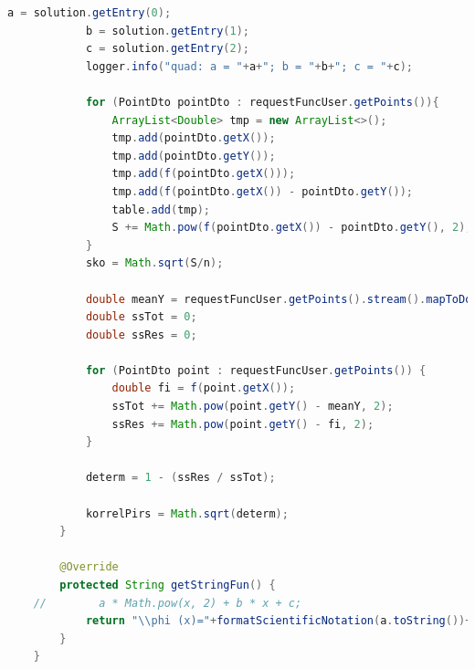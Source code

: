 \documentclass{article}
\begin{document}
\begin{lstlisting}[language=Java, caption={Квадратичная аппроксимация}]
            a = solution.getEntry(0);
            b = solution.getEntry(1);
            c = solution.getEntry(2);
            logger.info("quad: a = "+a+"; b = "+b+"; c = "+c);
    
            for (PointDto pointDto : requestFuncUser.getPoints()){
                ArrayList<Double> tmp = new ArrayList<>();
                tmp.add(pointDto.getX());
                tmp.add(pointDto.getY());
                tmp.add(f(pointDto.getX()));
                tmp.add(f(pointDto.getX()) - pointDto.getY());
                table.add(tmp);
                S += Math.pow(f(pointDto.getX()) - pointDto.getY(), 2);
            }
            sko = Math.sqrt(S/n);
    
            double meanY = requestFuncUser.getPoints().stream().mapToDouble(PointDto::getY).average().orElse(0);
            double ssTot = 0;
            double ssRes = 0;
    
            for (PointDto point : requestFuncUser.getPoints()) {
                double fi = f(point.getX());
                ssTot += Math.pow(point.getY() - meanY, 2);
                ssRes += Math.pow(point.getY() - fi, 2);
            }
    
            determ = 1 - (ssRes / ssTot);
    
            korrelPirs = Math.sqrt(determ);
        }
    
        @Override
        protected String getStringFun() {
    //        a * Math.pow(x, 2) + b * x + c;
            return "\\phi (x)="+formatScientificNotation(a.toString())+"\\cdot x^2+"+formatScientificNotation(b.toString())+"\\cdot x+"+formatScientificNotation(c.toString());
        }
    }
    
    
\end{lstlisting}
 
\end{document}
